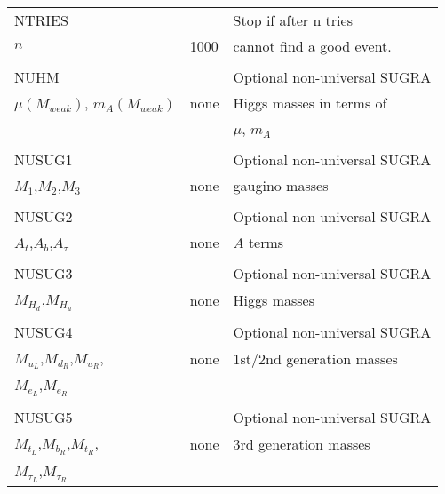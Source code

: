 \begin{center}
\begin{tabular}{lll}
NTRIES                 &                   & Stop if after n tries          \\
$n$                    & 1000              & cannot find a good event.      \\
                       &                   &                                \\
NUHM                   &                   & Optional non-universal SUGRA   \\
$\mu (M_{weak})$, $m_A(M_{weak})$ & none   & Higgs masses in terms of       \\
                       &                   & $\mu$, $m_A$                   \\
                       &                   &                                \\
NUSUG1                 &                   & Optional non-universal SUGRA   \\
$M_1$,$M_2$,$M_3$      & none              & gaugino masses                 \\
                       &                   &                                \\
NUSUG2                 &                   & Optional non-universal SUGRA   \\
$A_t$,$A_b$,$A_\tau$   & none              & $A$ terms                      \\
                       &                   &                                \\
NUSUG3                 &                   & Optional non-universal SUGRA   \\
$M_{H_d}$,$M_{H_u}$    & none              & Higgs masses                   \\
                       &                   &                                \\
NUSUG4                 &                   & Optional non-universal SUGRA   \\
$M_{u_L}$,$M_{d_R}$,$M_{u_R}$, & none      & 1st/2nd generation masses      \\
$M_{e_L}$,$M_{e_R}$    &                   &                                \\
                       &                   &                                \\
NUSUG5                 &                   & Optional non-universal SUGRA   \\
$M_{t_L}$,$M_{b_R}$,$M_{t_R}$, & none      & 3rd generation masses          \\
$M_{\tau_L}$,$M_{\tau_R}$ &                &                                \\
\hline\hline
\end{tabular}
\end{center}

